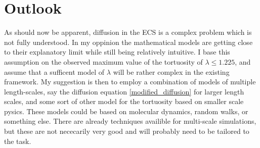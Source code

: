 \documentclass[a4paper,english, 12pt, twoside]{article}
\begin{document}
\section{Outlook}
As should now be apparent, diffusion in the ECS is a complex problem which is not fully understood. 
In my oppinion the mathematical models are getting close to their explanatory limit while still being relatively intuitive. 
I base this assumption on the observed maximum value of the tortuosity of $\lambda\leq 1.225$, and assume that a sufficent model of $\lambda$ will be rather complex in the existing framework. 
My suggestion is then to employ a combination of models of multiple length-scales, say the diffusion equation \ref{modified_diffusion} for larger length scales, and some sort of other model for the tortuosity based on smaller scale pysics. 
These models could be based on molecular dynamics, random walks, or something else. 
There are already techniques availible for multi-scale simulations, but these are not nececarily very good and will probably need to be tailored to the task.
%   

\printbibliography
\end{document}
